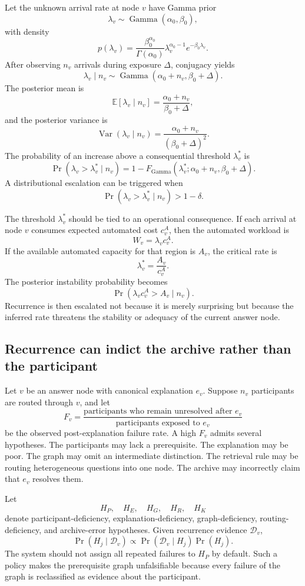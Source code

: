 \documentclass[11pt]{article}
\theoremstyle{definition}
\DeclareMathOperator{\Var}{Var}
\DeclareMathOperator{\Prob}{Pr}
\newcommand{\E}{\mathbb{E}}
\begin{document}
Let the unknown arrival rate at node \(v\) have Gamma prior
\[
\lambda_v
\sim
\operatorname{Gamma}(\alpha_0,\beta_0),
\]
with density
\[
p(\lambda_v)
=
\frac{\beta_0^{\alpha_0}}{\Gamma(\alpha_0)}
\lambda_v^{\alpha_0-1}
e^{-\beta_0\lambda_v}.
\]
After observing \(n_v\) arrivals during exposure \(\Delta\), conjugacy yields
\[
\lambda_v\mid n_v
\sim
\operatorname{Gamma}
\left(
\alpha_0+n_v,
\beta_0+\Delta
\right).
\]
The posterior mean is
\[
\E[\lambda_v\mid n_v]
=
\frac{\alpha_0+n_v}{\beta_0+\Delta},
\]
and the posterior variance is
\[
\Var(\lambda_v\mid n_v)
=
\frac{\alpha_0+n_v}{(\beta_0+\Delta)^2}.
\]
The probability of an increase above a consequential threshold \(\lambda_v^{*}\) is
\[
\Prob(\lambda_v>\lambda_v^{*}\mid n_v)
=
1-
F_{\operatorname{Gamma}}
\left(
\lambda_v^{*};
\alpha_0+n_v,
\beta_0+\Delta
\right).
\]
A distributional escalation can be triggered when
\[
\Prob(\lambda_v>\lambda_v^{*}\mid n_v)
>
1-\delta.
\]

The threshold \(\lambda_v^{*}\) should be tied to an operational consequence. If each arrival at node \(v\) consumes expected automated cost \(c_v^{A}\), then the automated workload is
\[
W_v
=
\lambda_v c_v^{A}.
\]
If the available automated capacity for that region is \(A_v\), the critical rate is
\[
\lambda_v^{*}
=
\frac{A_v}{c_v^{A}}.
\]
The posterior instability probability becomes
\[
\Prob(
\lambda_v c_v^{A}>A_v
\mid n_v
).
\]
Recurrence is then escalated not because it is merely surprising but because the inferred rate threatens the stability or adequacy of the current answer node.

\subsection{Recurrence can indict the archive rather than the participant}

Let \(v\) be an answer node with canonical explanation \(e_v\). Suppose \(n_v\) participants are routed through \(v\), and let
\[
F_v
=
\frac{
\text{participants who remain unresolved after }e_v
}{
\text{participants exposed to }e_v
}
\]
be the observed post-explanation failure rate. A high \(F_v\) admits several hypotheses. The participants may lack a prerequisite. The explanation may be poor. The graph may omit an intermediate distinction. The retrieval rule may be routing heterogeneous questions into one node. The archive may incorrectly claim that \(e_v\) resolves them.

Let
\[
H_P,\quad H_E,\quad H_G,\quad H_R,\quad H_K
\]
denote participant-deficiency, explanation-deficiency, graph-deficiency, routing-deficiency, and archive-error hypotheses. Given recurrence evidence \(\mathcal{D}_v\),
\[
\Prob(H_j\mid\mathcal{D}_v)
\propto
\Prob(\mathcal{D}_v\mid H_j)\Prob(H_j).
\]
The system should not assign all repeated failures to \(H_P\) by default. Such a policy makes the prerequisite graph unfalsifiable because every failure of the graph is reclassified as evidence about the participant.
\end{document}
